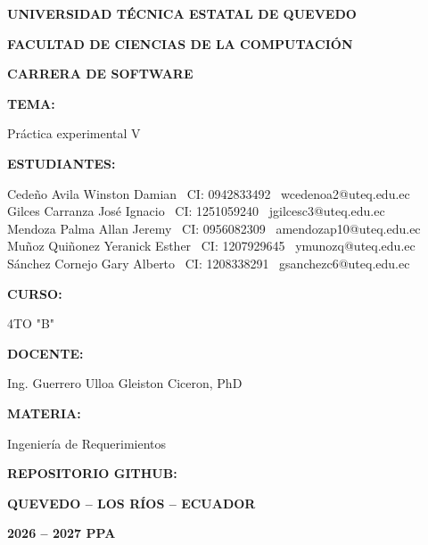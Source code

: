 \begin{titlepage}
\centering
{\bfseries\Large UNIVERSIDAD T\'ECNICA ESTATAL DE QUEVEDO\par}
\vspace{2mm}
{\bfseries\large FACULTAD DE CIENCIAS DE LA COMPUTACI\'ON\par}
\vspace{2mm}
{\bfseries\large CARRERA DE SOFTWARE\par}
\vspace{10mm}
{\bfseries TEMA:\par}
\vspace{2mm}
Pr\'actica experimental V
\vspace{8mm}

{\bfseries ESTUDIANTES:\par}
\vspace{2mm}
Cede\~no Avila Winston Damian \textbar\ CI: 0942833492 \textbar\ wcedenoa2@uteq.edu.ec\\
Gilces Carranza Jos\'e Ignacio \textbar\ CI: 1251059240 \textbar\ jgilcesc3@uteq.edu.ec\\
Mendoza Palma Allan Jeremy \textbar\ CI: 0956082309 \textbar\ amendozap10@uteq.edu.ec\\
Mu\~noz Qui\~nonez Yeranick Esther \textbar\ CI: 1207929645 \textbar\ ymunozq@uteq.edu.ec\\
S\'anchez Cornejo Gary Alberto \textbar\ CI: 1208338291 \textbar\ gsanchezc6@uteq.edu.ec
\vspace{8mm}

{\bfseries CURSO:\par}
4TO "B"
\vspace{6mm}

{\bfseries DOCENTE:\par}
Ing. Guerrero Ulloa Gleiston Ciceron, PhD
\vspace{6mm}

{\bfseries MATERIA:\par}
Ingenier\'ia de Requerimientos
\vspace{6mm}

{\bfseries REPOSITORIO GITHUB:\par}
\repourl
\vspace{10mm}

{\bfseries QUEVEDO -- LOS R\'IOS -- ECUADOR\par}
{\bfseries 2026 -- 2027 PPA\par}
\end{titlepage}
